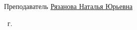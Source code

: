 \begin{titlepage}
\begin{center}
\begin{flushleft}
            \vspace{0.5cm}

            {Преподаватель \uline{Рязанова Наталья Юрьевна \hfill}}

            \vspace{0.5cm}

        \end{flushleft}

        \vfill

        \the\year\ г.

    \end{center}
\end{titlepage}

